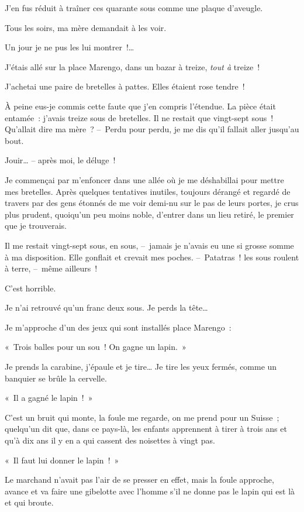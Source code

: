 \documentclass[french,twoside]{book} %
\begin{document}
J’en fus réduit à traîner ces quarante sous comme une plaque d’aveugle.\par
Tous les soirs, ma mère demandait à les voir.\par
Un jour je ne pus les lui montrer !…\par
J’étais allé sur la place Marengo, dans un bazar à treize, \emph{tout à} treize !\par
J’achetai une paire de bretelles à pattes. Elles étaient rose tendre !\par
À peine eus-je commis cette faute que j’en compris l’étendue. La pièce était entamée : j’avais treize sous de bretelles. Il ne restait que vingt-sept sous ! Qu’allait dire ma mère ? – Perdu pour perdu, je me dis qu’il fallait aller jusqu’au bout.\par
Jouir… – après moi, le déluge !\par
Je commençai par m’enfoncer dans une allée où je me déshabillai pour mettre mes bretelles. Après quelques tentatives inutiles, toujours dérangé et regardé de travers par des gens étonnés de me voir demi-nu sur le pas de leurs portes, je crus plus prudent, quoiqu’un peu moins noble, d’entrer dans un lieu retiré, le premier que je trouverais.\par
Il me restait vingt-sept sous, en sous, – jamais je n’avais eu une si grosse somme à ma disposition. Elle gonflait et crevait mes poches. – Patatras ! les sous roulent à terre, – même ailleurs !\par
C’est horrible.\par
Je n’ai retrouvé qu’un franc deux sous. Je perds la tête…\par
Je m’approche d’un des jeux qui sont installés place Marengo :\par
« Trois balles pour un sou ! On gagne un lapin. »\par
Je prends la carabine, j’épaule et je tire… Je tire les yeux fermés, comme un banquier se brûle la cervelle.\par
« Il a gagné le lapin ! »\par
\bigbreak
\noindent C’est un bruit qui monte, la foule me regarde, on me prend pour un Suisse ; quelqu’un dit que, dans ce pays-là, les enfants apprennent à tirer à trois ans et qu’à dix ans il y en a qui cassent des noisettes à vingt pas.\par
« Il faut lui donner le lapin ! »\par
Le marchand n’avait pas l’air de se presser en effet, mais la foule approche, avance et va faire une gibelotte avec l’homme s’il ne donne pas le lapin qui est là et qui broute.\par
\end{document}
